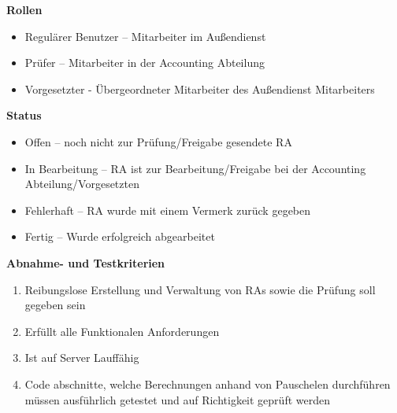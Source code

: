 \textbf{Rollen}
\begin{itemize}
	\item Regulärer Benutzer – Mitarbeiter im Außendienst
	\item Prüfer – Mitarbeiter in der Accounting Abteilung
	\item Vorgesetzter - Übergeordneter Mitarbeiter des Außendienst Mitarbeiters
\end{itemize}

\textbf{Status}
\begin{itemize}
	\item Offen – noch nicht zur Prüfung/Freigabe gesendete RA
	\item In Bearbeitung – RA ist zur Bearbeitung/Freigabe bei der Accounting Abteilung/Vorgesetzten
	\item Fehlerhaft – RA wurde mit einem Vermerk zurück gegeben
	\item Fertig – Wurde erfolgreich abgearbeitet
\end{itemize}

\textbf{Abnahme- und Testkriterien}
\begin{enumerate}
	\item Reibungslose Erstellung und Verwaltung von RAs sowie die Prüfung soll gegeben sein
	\item Erfüllt alle Funktionalen Anforderungen
	\item Ist auf Server Lauffähig
	\item Code abschnitte, welche Berechnungen anhand von Pauschelen durchführen müssen ausführlich getestet und auf Richtigkeit geprüft werden
\end{enumerate}
